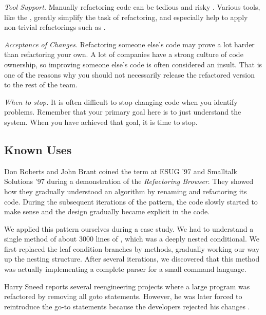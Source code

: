 \documentclass[a4paper,10pt,twoside]{book}
\begin{document}
\begin{bulletlist}
\item \emph{Tool Support.}
Manually refactoring code can be tedious and risky \cite{Fowl99a}. Various tools, like the  \cite{Robe97a}, greatly simplify the task of refactoring, and especially help to apply non-trivial refactorings such as .

\item \emph{Acceptance of Changes.}
Refactoring someone else's code may prove a lot harder than refactoring your own. A lot of companies have a strong culture of code ownership, so improving someone else's code is often considered an insult. That is one of the reasons why you should not necessarily release the refactored version to the rest of the team.

\item \emph{When to stop.}
It is often difficult to stop changing code when you identify problems. Remember that your primary goal here is to just understand the system. When you have achieved that goal, it is time to stop. 
\end{bulletlist}

\subsection*{Known Uses}

Don Roberts and John Brant coined the term  at ESUG '97 and Smalltalk Solutions '97 during a demonstration of the \emph{Refactoring Browser}. They showed how they gradually understood an algorithm by renaming and refactoring its code. During the subsequent iterations of the pattern, the code slowly started to make sense and the design gradually became explicit in the code. 

We applied this pattern ourselves during a  case study. We had to understand a single method of about 3000 lines of , which was a deeply nested conditional. We first replaced the leaf condition branches by methods, gradually working our way up the nesting structure. After several iterations, we discovered that this method was actually implementing a complete parser for a small command language. 

Harry Sneed reports several reengineering projects where a large  program was refactored by removing all goto statements. However, he was later forced to reintroduce the go-to statements because the developers rejected his changes \cite{Snee99a}.
\end{document}
